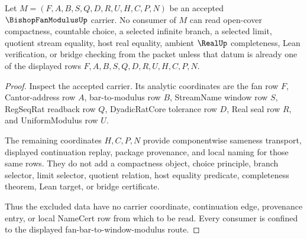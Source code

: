 \begin{theorem}
\label{thm:bishop-fan-modulus-nonescape}
Let $M=(F,A,B,S,Q,D,R,U,H,C,P,N)$ be an accepted $\BishopFanModulusUp$ carrier. No consumer of $M$ can read open-cover compactness, countable choice, a selected infinite branch, a selected limit, quotient stream equality, host real equality, ambient $\RealUp$ completeness, Lean verification, or bridge checking from the packet unless that datum is already one of the displayed rows $F,A,B,S,Q,D,R,U,H,C,P,N$.
\end{theorem}
\begin{proof}
Inspect the accepted carrier. Its analytic coordinates are the fan row $F$, Cantor-address row $A$, bar-to-modulus row $B$, StreamName window row $S$, RegSeqRat readback row $Q$, DyadicRatCore tolerance row $D$, Real seal row $R$, and UniformModulus row $U$.

The remaining coordinates $H,C,P,N$ provide componentwise sameness transport, displayed continuation replay, package provenance, and local naming for those same rows. They do not add a compactness object, choice principle, branch selector, limit selector, quotient relation, host equality predicate, completeness theorem, Lean target, or bridge certificate.

Thus the excluded data have no carrier coordinate, continuation edge, provenance entry, or local NameCert row from which to be read. Every consumer is confined to the displayed fan-bar-to-window-modulus route.
\end{proof}



